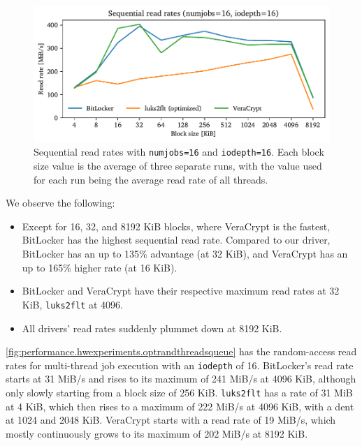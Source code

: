 \begin{figure}[htb!]
	\center
	\includegraphics[scale=1]{../fig/performance.hwexperiments.optseqthreadsqueue.pdf}
	\caption[
		Sequential read rates with \texttt{numjobs=16} and \texttt{iodepth=16}
	]{
		Sequential read rates with \texttt{numjobs=16} and \texttt{iodepth=16}. Each block size value is the average of three separate runs, with the value used for each run being the average read rate of all threads.
	}
	\label{fig:performance.hwexperiments.optseqthreadsqueue}
\end{figure}

We observe the following:
\begin{itemize}
	\item Except for 16, 32, and 8192 KiB blocks, where VeraCrypt is the fastest, BitLocker has the highest sequential read rate. Compared to our driver, BitLocker has an up to 135\% advantage (at 32 KiB), and VeraCrypt has an up to 165\% higher rate (at 16 KiB).
	\item BitLocker and VeraCrypt have their respective maximum read rates at 32 KiB, \texttt{luks2flt} at 4096.
	\item All drivers' read rates suddenly plummet down at 8192 KiB.
\end{itemize}

\autoref{fig:performance.hwexperiments.optrandthreadsqueue} has the random-access read rates for multi-thread job execution with an \texttt{iodepth} of 16. BitLocker's read rate starts at 31 MiB/s and rises to its maximum of 241 MiB/s at 4096 KiB, although only slowly starting from a block size of 256 KiB. \texttt{luks2flt} has a rate of 31 MiB at 4 KiB, which then rises to a maximum of 222 MiB/s at 4096 KiB, with a dent at 1024 and 2048 KiB. VeraCrypt starts with a read rate of 19 MiB/s, which mostly continuously grows to its maximum of 202 MiB/s at 8192 KiB.

